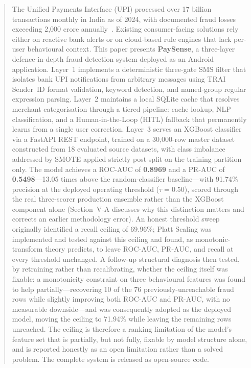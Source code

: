 \documentclass[conference]{IEEEtran}
\begin{document}
\begin{abstract}
The Unified Payments Interface (UPI) processed over 17 billion transactions
monthly in India as of 2024, with documented fraud losses exceeding
\textrm{\rupee}2{,}000 crore annually~\cite{rbi2024}. Existing consumer-facing
solutions rely either on reactive bank alerts or on cloud-based rule engines
that lack per-user behavioural context. This paper presents \textbf{PaySense},
a three-layer defence-in-depth fraud detection system deployed as an Android
application. Layer~1 implements a deterministic three-gate SMS filter that
isolates bank UPI notifications from arbitrary messages using TRAI
Sender~ID format validation, keyword detection, and named-group regular
expression parsing. Layer~2 maintains a local SQLite cache that resolves
merchant categorisation through a tiered pipeline: cache lookup, NLP
classification, and a Human-in-the-Loop (HITL) fallback that permanently
learns from a single user correction. Layer~3 serves an XGBoost classifier
via a FastAPI REST endpoint, trained on a 30{,}000-row master dataset
constructed from 18 evaluated source datasets, with class imbalance addressed
by SMOTE applied strictly post-split on the training partition only. The model
achieves a ROC-AUC of \textbf{0.8969} and a PR-AUC of \textbf{0.5498}---13.05
times above the random-classifier baseline---with 91.74\% precision at the
deployed operating threshold ($\tau=0.50$), scored through the real
three-scorer production ensemble rather than the XGBoost component alone
(Section~V-A discusses why this distinction matters and corrects an
earlier methodology error). An honest threshold sweep
originally identified a recall ceiling of 69.96\%; Platt Scaling was
implemented and tested against this ceiling and found, as monotonic-transform
theory predicts, to leave ROC-AUC, PR-AUC, and recall at every threshold
unchanged. A follow-up structural diagnosis then tested, by retraining rather
than recalibrating, whether the ceiling itself was fixable: a
monotonicity constraint on three behavioural features was found to help
partially---recovering 10 of the 76 previously-unreachable fraud rows while
slightly improving both ROC-AUC and PR-AUC, with no measurable downside---and
was consequently adopted as the deployed model, moving the ceiling to
71.94\% while leaving the remaining rows unreached. The ceiling is therefore
a ranking limitation of the model's feature set that is partially, but not
fully, fixable by model structure alone, and is reported honestly as an
open limitation rather than a solved problem. The complete system is
released as open-source code.
\end{abstract}
\end{document}
